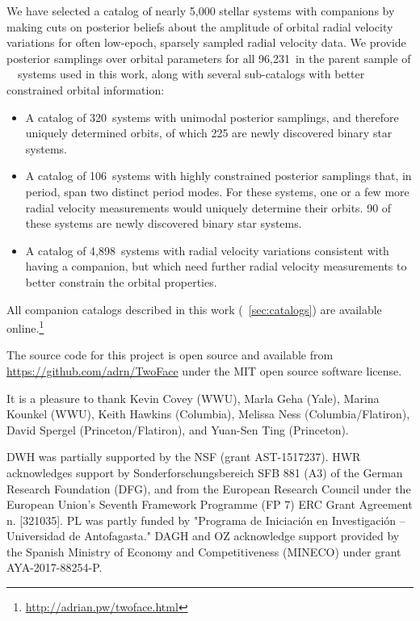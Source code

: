 \documentclass[modern, letterpaper]{aastex62}
\newcommand{\apogee}{\project{\acronym{APOGEE}}}
\newcommand{\DR}{\acronym{DR14}}
\newcommand{\nstars}{96,231}
\newcommand{\nhighK}{4,898}
\newcommand{\nbimodal}{106}
\newcommand{\nunimodal}{320}
\begin{document}
We have selected a catalog of nearly 5,000 stellar systems with companions by
making cuts on posterior beliefs about the amplitude of orbital radial velocity
variations for often low-epoch, sparsely sampled radial velocity data.
We provide posterior samplings over orbital parameters for all \nstars\ in the
parent sample of \apogee\ \DR\ systems used in this work, along with several
sub-catalogs with better constrained orbital information:
\begin{itemize}
    \item A catalog of \nunimodal\ systems with unimodal posterior samplings,
    and therefore uniquely determined orbits, of which 225 are newly discovered
    binary star systems.
    \item A catalog of \nbimodal\ systems with highly constrained posterior
    samplings that, in period, span two distinct period modes.
    For these systems, one or a few more radial velocity measurements would
    uniquely determine their orbits.
    90 of these systems are newly discovered binary star systems.
    \item A catalog of \nhighK\ systems with radial velocity variations
    consistent with having a companion, but which need further radial velocity
    measurements to better constrain the orbital properties.
\end{itemize}
All companion catalogs described in this work (\sectionname~\ref{sec:catalogs})
are available online.\footnote{\url{http://adrian.pw/twoface.html}}

The source code for this project is open source and available from
\url{https://github.com/adrn/TwoFace} under the MIT open source software
license.

\acknowledgements

It is a pleasure to thank
Kevin Covey (WWU),
Marla Geha (Yale),
Marina Kounkel (WWU),
Keith Hawkins (Columbia),
Melissa Ness (Columbia/Flatiron),
David Spergel (Princeton/Flatiron),
and Yuan-Sen Ting (Princeton).

DWH was partially supported by the NSF (grant AST-1517237).
HWR acknowledges support by Sonderforschungsbereich SFB 881 (A3) of the German
Research Foundation (DFG), and from the European Research Council under the
European Union’s Seventh Framework Programme (FP 7) ERC Grant Agreement
n. [321035].
PL was partly funded by "Programa de Iniciaci\'on en Investigaci\'on –
Universidad de Antofagasta."
DAGH and OZ acknowledge support provided by the Spanish Ministry of Economy and
Competitiveness (MINECO) under grant AYA-2017-88254-P.
\end{document}
